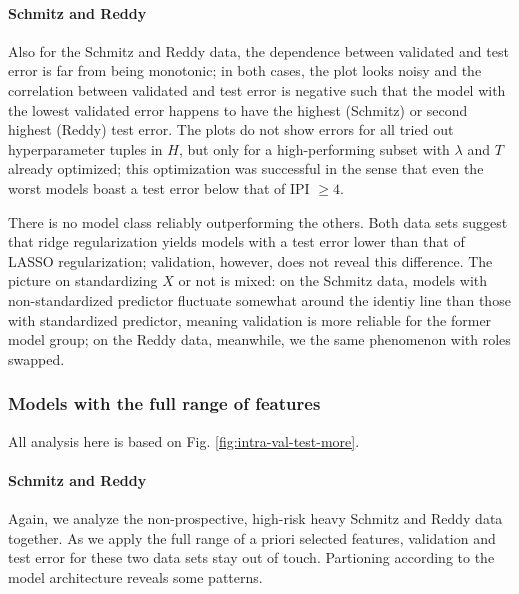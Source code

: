 \paragraph{Schmitz and Reddy}
Also for the Schmitz and Reddy data, the dependence between validated and test error is far from 
being monotonic; in both cases, the plot looks noisy and the correlation between validated and test 
error is negative such that the model with the lowest validated error happens to have the highest 
(Schmitz) or second highest (Reddy) test error. The plots do not show errors for all tried out 
hyperparameter tuples in $H$, but only for a high-performing subset with $\lambda$ and $T$ already 
optimized; this optimization was successful in the sense that even the worst models boast a test 
error below that of IPI $\geq 4$.

There is no model class reliably outperforming the others. Both data sets suggest that ridge 
regularization yields models with a test error lower than that of LASSO regularization; validation, 
however, does not reveal this difference. The picture on standardizing $X$ or not is mixed: on the 
Schmitz data, models with non-standardized predictor fluctuate somewhat around the identiy line than 
those with standardized predictor, meaning validation is more reliable for the former model group;
on the Reddy data, meanwhile, we the same phenomenon with roles swapped.

\subsubsection{Models with the full range of features}



All analysis here is based on Fig. \ref{fig:intra-val-test-more}.

\paragraph{Schmitz and Reddy}
Again, we analyze the non-prospective, high-risk heavy Schmitz and Reddy data together. As we apply
the full range of a priori selected features, validation and test error for these two data sets 
stay out of touch. Partioning according to the model architecture reveals some patterns. 

